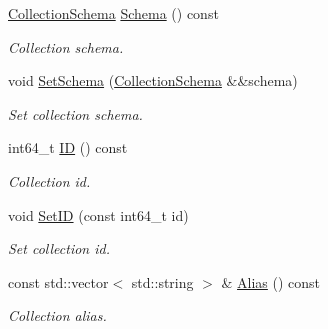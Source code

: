 \begin{DoxyCompactItemize}
\item 
\mbox{\label{classmilvus_1_1_collection_desc_a120f0da00f0c8162b2891f7c5e9d2242}} 
\hyperlink{classmilvus_1_1_collection_schema}{Collection\+Schema} \hyperlink{classmilvus_1_1_collection_desc_a120f0da00f0c8162b2891f7c5e9d2242}{Schema} () const
\begin{DoxyCompactList}\small\item\em Collection schema. \end{DoxyCompactList}\item 
\mbox{\label{classmilvus_1_1_collection_desc_a450ed4fd3fd78d2a37992874a21afa7b}} 
void \hyperlink{classmilvus_1_1_collection_desc_a450ed4fd3fd78d2a37992874a21afa7b}{Set\+Schema} (\hyperlink{classmilvus_1_1_collection_schema}{Collection\+Schema} \&\&schema)
\begin{DoxyCompactList}\small\item\em Set collection schema. \end{DoxyCompactList}\item 
\mbox{\label{classmilvus_1_1_collection_desc_a6338d6fc7104d7d046e18196dca63b2c}} 
int64\+\_\+t \hyperlink{classmilvus_1_1_collection_desc_a6338d6fc7104d7d046e18196dca63b2c}{ID} () const
\begin{DoxyCompactList}\small\item\em Collection id. \end{DoxyCompactList}\item 
\mbox{\label{classmilvus_1_1_collection_desc_a80942c758981691e9a2be3ebf8e79932}} 
void \hyperlink{classmilvus_1_1_collection_desc_a80942c758981691e9a2be3ebf8e79932}{Set\+ID} (const int64\+\_\+t id)
\begin{DoxyCompactList}\small\item\em Set collection id. \end{DoxyCompactList}\item 
\mbox{\label{classmilvus_1_1_collection_desc_a6357d0287c7d8d7075f51a5538b9cb48}} 
const std\+::vector$<$ std\+::string $>$ \& \hyperlink{classmilvus_1_1_collection_desc_a6357d0287c7d8d7075f51a5538b9cb48}{Alias} () const
\begin{DoxyCompactList}\small\item\em Collection alias. \end{DoxyCompactList}\item 

\end{DoxyCompactItemize}
